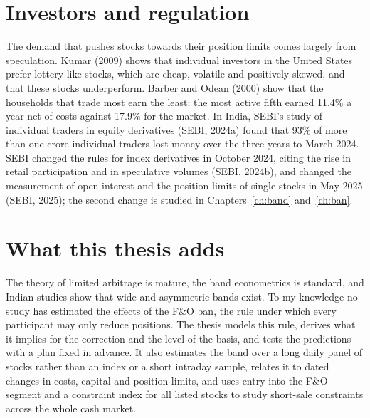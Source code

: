\section{Investors and regulation}
The demand that pushes stocks towards their position limits comes largely from speculation. Kumar (2009) shows that
individual investors in the United States prefer lottery-like stocks, which are cheap, volatile and positively skewed, and
that these stocks underperform. Barber and Odean (2000) show that the households that trade most earn the least: the most
active fifth earned 11.4\% a year net of costs against 17.9\% for the market. In India, SEBI's study of individual traders
in equity derivatives (SEBI, 2024a) found that 93\% of more than one crore individual traders lost money over the three
years to March 2024. SEBI changed the rules for index derivatives in October 2024, citing the rise in retail participation
and in speculative volumes (SEBI, 2024b), and changed the measurement of open interest and the position limits of single
stocks in May 2025 (SEBI, 2025); the second change is studied in Chapters~\ref{ch:band} and~\ref{ch:ban}.

\section{What this thesis adds}
The theory of limited arbitrage is mature, the band econometrics is standard, and Indian studies show that wide and
asymmetric bands exist. To my knowledge no study has estimated the effects of the F\&O ban, the rule under which every
participant may only reduce positions. The thesis models this rule, derives what it implies for the correction and the
level of the basis, and tests the predictions with a plan fixed in advance. It also estimates the band over a long daily
panel of stocks rather than an index or a short intraday sample, relates it to dated changes in costs, capital and
position limits, and uses entry into the F\&O segment and a constraint index for all listed stocks to study short-sale
constraints across the whole cash market.
